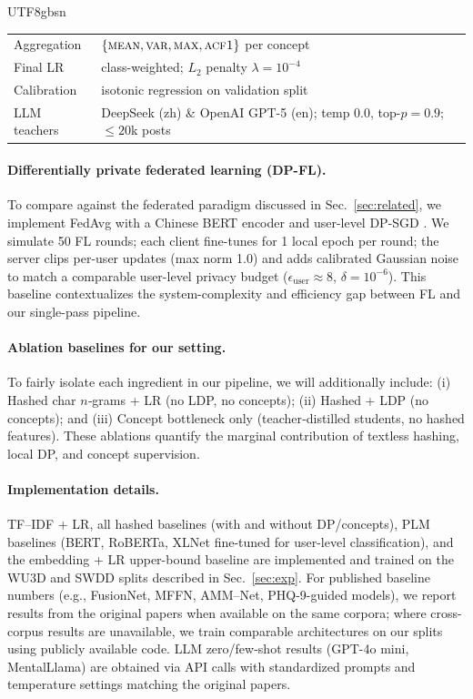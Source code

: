 \documentclass[lettersize,journal]{IEEEtran}
\begin{document}
\begin{CJK*}{UTF8}{gbsn}
\begin{table}[t]
{\begin{tabular}{p{2cm}p{9cm}}
Aggregation & $\{\textsc{mean},\textsc{var},\textsc{max},\textsc{acf1}\}$ per concept \\

Final LR & class-weighted; $L_2$ penalty $\lambda=10^{-4}$ \\

Calibration & isotonic regression on validation split \\

LLM teachers & DeepSeek (zh) \& OpenAI GPT-5 (en); temp $0.0$, top-$p{=}0.9$; $\leq 20$k posts \\
\bottomrule
\end{tabular}
}
\end{table}

\paragraph{Differentially private federated learning (DP\mbox{-}FL).}
To compare against the federated paradigm discussed in Sec.~\ref{sec:related}, we implement FedAvg with a Chinese BERT encoder and user\mbox{-}level DP\mbox{-}SGD \cite{mcmahan2018dpfl,khalil2024patterns}. We simulate 50 FL rounds; each client fine-tunes for 1 local epoch per round; the server clips per-user updates (max norm 1.0) and adds calibrated Gaussian noise to match a comparable user-level privacy budget ($\epsilon_{\text{user}}{\approx}8$, $\delta{=}10^{-6}$). This baseline contextualizes the system-complexity and efficiency gap between FL and our single-pass pipeline.

\paragraph{Ablation baselines for our setting.}
To fairly isolate each ingredient in our pipeline, we will additionally include: (i) Hashed char $n$‑grams + LR (no LDP, no concepts); (ii) Hashed + LDP (no concepts); and (iii) Concept bottleneck only (teacher‑distilled students, no hashed features). These ablations quantify the marginal contribution of textless hashing, local DP, and concept supervision.

\paragraph{Implementation details.}
TF--IDF + LR, all hashed baselines (with and without DP/concepts), PLM baselines (BERT, RoBERTa, XLNet fine-tuned for user-level classification), and the embedding + LR upper-bound baseline are implemented and trained on the WU3D and SWDD splits described in Sec.~\ref{sec:exp}. For published baseline numbers (e.g., FusionNet, MFFN, AMM--Net, PHQ-9-guided models), we report results from the original papers when available on the same corpora; where cross-corpus results are unavailable, we train comparable architectures on our splits using publicly available code. LLM zero/few-shot results (GPT-4o mini, MentalLlama) are obtained via API calls with standardized prompts and temperature settings matching the original papers. 

\end{CJK*}
\end{document}
